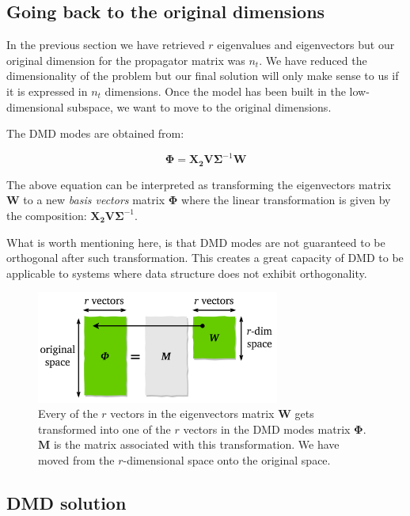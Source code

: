 \documentclass[10pt,twocolumn]{article}
\begin{document}
\subsection{Going back to the original dimensions}

In the previous section we have retrieved $r$ eigenvalues and eigenvectors but our original dimension for the propagator matrix was $n_t$. We have reduced the dimensionality of the problem but our final solution will only make sense to us if it is expressed in $n_t$ dimensions.
Once the model has been built in the low-dimensional subspace, we want to move to the original dimensions. 

The DMD modes are obtained from:

\begin{equation} \label{eq:A_underline}
\mathbf{\Phi} = \mathbf{X_2} \mathbf{V} \mathbf{\Sigma}^{-1} \mathbf{W}
\end{equation}

The above equation can be interpreted as transforming the eigenvectors matrix $\mathbf{W}$ to a new \textit{basis vectors} matrix $\mathbf{\Phi}$ where the linear transformation is given by the composition: $\mathbf{X_2} \mathbf{V} \mathbf{\Sigma}^{-1}$.

What is worth mentioning here, is that DMD modes are not guaranteed to be orthogonal after such transformation. This creates a great capacity of DMD to be applicable to systems where data structure does not exhibit orthogonality.

\begin{figure}[H]
\centering\includegraphics[width=8cm]{dmd-modes-transformation.png}
\caption{Every of the $r$ vectors in the eigenvectors matrix $\mathbf{W}$ gets transformed into one of the $r$ vectors in the DMD modes matrix $\mathbf{\Phi}$. $\mathbf{M}$ is the matrix associated with this transformation. We have moved from the $r$-dimensional space onto the original space.}
\label{fig:linear_system}
\end{figure}

\subsection{DMD solution}
\end{document}
